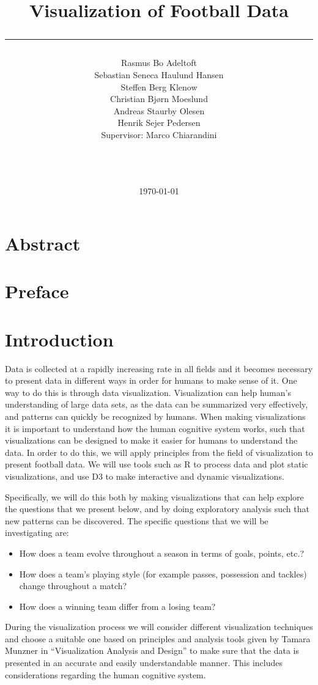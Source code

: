 \documentclass[a4paper,12pt]{article}
\title{Visualization of Football Data\\\rule{10cm}{0.5mm}}
\author{Rasmus Bo Adeltoft\\Sebastian Seneca Haulund Hansen\\Steffen Berg Klenow\\Christian Bjørn Moeslund\\Andreas Staurby Olesen\\Henrik Sejer Pedersen
\\Supervisor: Marco Chiarandini\\\rule{5.5cm}{0.5mm}\\}
\date{\today}
\begin{document}
\maketitle
\newpage
\section{Abstract}

\section{Preface}

\newpage
\tableofcontents
\newpage
\section{Introduction}
Data is collected at a rapidly increasing rate in all fields and it becomes necessary to present data in different ways in order for humans to make sense of
it. One way to do this is through data visualization. Visualization can help
human's understanding of large data sets, as the data can be summarized very
effectively, and patterns can quickly be recognized by humans. When making
visualizations it is important to understand how the human cognitive system
works, such that visualizations can be designed to make it easier for humans to
understand the data. In order to do this, we will apply principles from the field
of visualization to present football data. We will use tools such as R to process
data and plot static visualizations, and use D3 to make interactive and dynamic
visualizations.

Specifically, we will do this both by making visualizations that can help explore
the questions that we present below, and by doing exploratory analysis such
that new patterns can be discovered. The specific questions that we will be
investigating are:
\begin{itemize}
\item How does a team evolve throughout a season in terms of goals, points,
etc.?
\item How does a team’s playing style (for example passes, possession and tackles)
change throughout a match?
\item How does a winning team differ from a losing team?
\end{itemize}
During the visualization process we will consider different visualization techniques
and choose a suitable one based on principles and analysis tools given
by Tamara Munzner in “Visualization Analysis and Design” to make sure that
the data is presented in an accurate and easily understandable manner. This
includes considerations regarding the human cognitive system.
\end{document}
